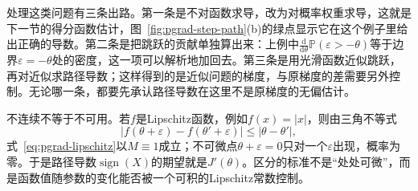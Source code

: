 处理这类问题有三条出路。第一条是不对函数求导，改为对概率权重求导，这就是下一节的得分函数估计，图~\ref{fig:pgrad-step-path}(b)的绿点显示它在这个例子里给出正确的导数。第二条是把跳跃的贡献单独算出来：上例中$\frac{\mathrm{d}}{\mathrm{d}\theta}\mathbb{P}(\varepsilon>-\theta)$等于边界$\varepsilon=-\theta$处的密度，这一项可以解析地加回去。第三条是用光滑函数近似跳跃，再对近似求路径导数；这样得到的是近似问题的梯度，与原梯度的差需要另外控制。无论哪一条，都要先承认路径导数在这里不是原梯度的无偏估计。

不连续不等于不可用。若$f$是Lipschitz函数，例如$f(x)=\lvert x\rvert$，则由三角不等式
\[
  \bigl\lvert f(\theta+\varepsilon)-f(\theta'+\varepsilon)\bigr\rvert\leq\lvert\theta-\theta'\rvert,
\]
式~\eqref{eq:pgrad-lipschitz}以$M\equiv1$成立；不可微点$\theta+\varepsilon=0$只对一个$\varepsilon$出现，概率为零。于是路径导数$\operatorname{sign}(X)$的期望就是$J'(\theta)$。区分的标准不是“处处可微”，而是函数值随参数的变化能否被一个可积的Lipschitz常数控制。
